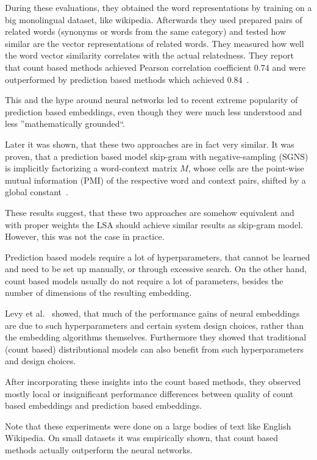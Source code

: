     During these evaluations, they obtained the word representations by training on a big monolingual dataset, like wikipedia.
    Afterwards they used prepared pairs of related words (synonyms or words from the same category) and tested
    how similar are the vector representations of related words. 
    They measured how well the word vector similarity correlates with the actual relatedness. 
    They report that count based methods achieved Pearson correlation coefficient $0.74$ and were outperformed by prediction based methods which achieved $0.84$~\cite{baroni2014don}.
    
    This and the hype around neural networks led to recent extreme popularity of prediction based embeddings,
    even though they were much less understood and less ''mathematically grounded``.
    
    Later it was shown, that these two approaches are in fact very similar.
    It was proven, that a prediction based model skip-gram with negative-sampling (SGNS) 
    is implicitly factorizing a word-context matrix $M$,
    whose cells are the point-wise mutual information (PMI) of the respective word and context pairs, 
    shifted by a global constant~\cite{levy2014neural}. %
    
    These results suggest, that these two approaches are somehow equivalent and with proper weights the LSA should achieve similar results as skip-gram model. 
    However, this was not the case in practice.
    
    Prediction based models require a lot of hyperparameters, that cannot be learned and need to be set up manually,
    or through excessive search.
    On the other hand, count based models usually do not require a lot of parameters, besides the number of dimensions of the resulting embedding. 
    
    Levy et al.~\cite{levy2015improving} %
    showed, that much  of  the  performance  gains  of  neural embeddings  are  due to such hyperparameters and certain system design choices, rather than the embedding algorithms themselves. 
    Furthermore they showed that traditional (count based) distributional models
    can also benefit from such hyperparameters and design choices.
    
    After incorporating these insights into the count based methods, 
    they observed mostly local or insignificant performance differences between quality of count based embeddings and prediction based embeddings.
    
    Note that these experiments were done on a large bodies of text like English Wikipedia.   
    On small datasets it was empirically shown, that count based methods actually outperform the neural networks\cite{altszyler2016comparative}. %
    
    
